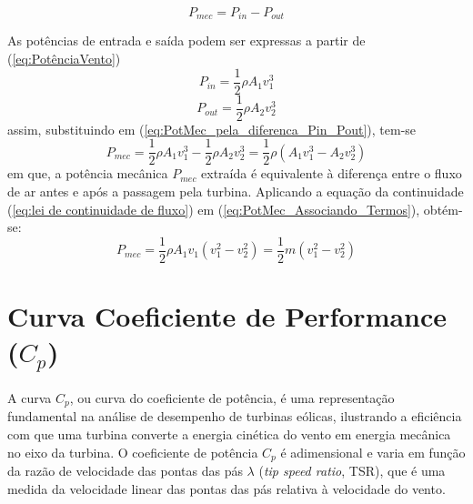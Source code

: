     \begin{equation}
        P_{mec}=P_{in}-P_{out}
        \label{eq:PotMec_pela_diferenca_Pin_Pout}
    \end{equation}
    \par As potências de entrada e saída podem ser expressas a partir de (\ref{eq:PotênciaVento})
    \begin{equation}
        P_{in}=\frac{1}{2} \rho A_1 v_1^3
        \label{eq:PotênciaEntrada}
    \end{equation}
    \begin{equation}
        P_{out}=\frac{1}{2} \rho A_2 v_2^3
        \label{eq:PotênciaSaida}
    \end{equation}
    assim, substituindo em  (\ref{eq:PotMec_pela_diferenca_Pin_Pout}), tem-se
    \begin{equation}
        P_{mec}=\frac{1}{2} \rho A_1 v_1^3 - \frac{1}{2} \rho A_2 v_2^3 =\frac{1}{2} \rho (A_1 v_1^3 - A_2 v_2^3)
        \label{eq:PotMec_Associando_Termos}
    \end{equation}
    em que, a potência mecânica $P_{mec}$ extraída é equivalente à diferença entre o fluxo de ar antes e após a passagem pela turbina. Aplicando a equação da continuidade (\ref{eq:lei de continuidade de fluxo}) em  (\ref{eq:PotMec_Associando_Termos}), obtém-se:
        \begin{equation}
        P_{mec}=\frac{1}{2} \rho A_1 v_1(v_1^2 - v_2^2) = \frac{1}{2} m (v_1^2 - v_2^2)
        \label{eq:PotMec_pela_Eq.Cont.Fluxo}
    \end{equation}
    
\section{Curva Coeficiente de Performance (\(C_{p}\))}
    \par A curva $C_p$, ou curva do coeficiente de potência, é uma representação fundamental na análise de desempenho de turbinas eólicas, ilustrando a eficiência com que uma turbina converte a energia cinética do vento em energia mecânica no eixo da turbina. O coeficiente de potência $C_p$ é adimensional e varia em função da razão de velocidade das pontas das pás $\lambda$ (\textit{tip speed ratio}, TSR), que é uma medida da velocidade linear das pontas das pás relativa à velocidade do vento.

